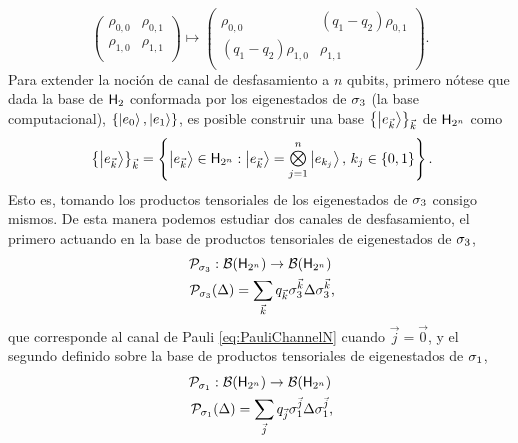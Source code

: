 \begin{equation}
    \begin{pmatrix}
        \rho_{0,0} & \rho_{0,1}\\
        \rho_{1,0} & \rho_{1,1}\\
    \end{pmatrix}\mapsto\begin{pmatrix}
        \rho_{0,0} & (q_{1}-q_{2})\rho_{0,1}\\
        (q_{1}-q_{2})\rho_{1,0} & \rho_{1,1}\\
    \end{pmatrix}.\nonumber
\end{equation}
Para extender la noción de canal de desfasamiento a $n$ qubits, primero nótese que dada la base de ${\sf H}_{2}$ conformada por los eigenestados de $\sigma_{3}$ (la base computacional), $\{\ket{e_{0}},\ket{e_{1}}\}$, es posible construir una base $\left\{\ket{e_{\vec{k}}}\right\}_{\vec{k}}$ de ${\sf H}_{2^{n}}$ como
\begin{equation}
    \left\{\ket{e_{\vec{k}}}\right\}_{\vec{k}}=\left\{\ket{e_{\vec{k}}}\in\hilbert_{2^{n}}: \ket{e_{\vec{k}}}=\Motimes_{j=1}^{n}\ket{e_{k_{j}}},\,k_{j}\in\{0,1\}\right\} \rlap{.}\nonumber
\end{equation}
Esto es, tomando los productos tensoriales de los eigenestados de $\sigma_{3}$ consigo mismos. De esta manera podemos estudiar dos canales de desfasamiento, el primero actuando en la base de productos tensoriales de eigenestados de $\sigma_{3}$,
\begin{equation}\label{eq:PauliChannel3}
    \begin{gathered}
        \mcP_{\pauli{3}}:\mcB(\hilbert_{2^{n}}) \rightarrow \mcB(\hilbert_{2^{n}})\\
        \mcP_{\pauli{3}}(\Delta)=\sum_{\vec{k}}q_{\vec{k}}\pauli{3}^{\vec{k}}\Delta\pauli{3}^{\vec{k}}\rlap{,}
    \end{gathered}
\end{equation}
que corresponde al canal de Pauli \ref{eq:PauliChannelN} cuando $\vec{j}=\vec{0}$, y el segundo definido sobre la base de productos tensoriales de eigenestados de $\sigma_{1}$,
\begin{equation}\label{eq:PauliChannel1}
    \begin{gathered}
        \mcP_{\pauli{1}}:\mcB(\hilbert_{2^{n}}) \rightarrow \mcB(\hilbert_{2^{n}})\\
        \mcP_{\pauli{1}}(\Delta)=\sum_{\vec{j}}q_{\vec{j}}\pauli{1}^{\vec{j}}\Delta\pauli{1}^{\vec{j}}\rlap{,}
    \end{gathered}
\end{equation}

